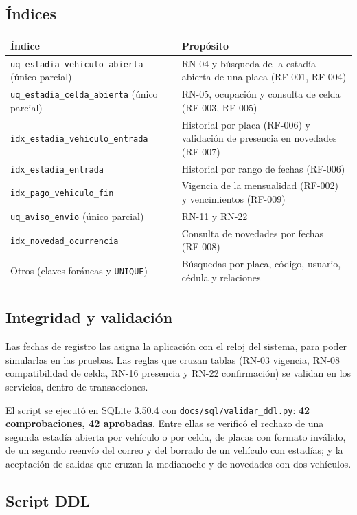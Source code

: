 \subsection{Índices}
\begin{longtable}{>{\raggedright\arraybackslash}p{6cm}>{\raggedright\arraybackslash}p{8.4cm}}
\toprule
\textbf{Índice} & \textbf{Propósito}\\
\midrule\endhead
\texttt{uq\_estadia\_vehiculo\_abierta} (único parcial) & RN-04 y búsqueda de la estadía abierta de una placa (RF-001, RF-004)\\
\texttt{uq\_estadia\_celda\_abierta} (único parcial) & RN-05, ocupación y consulta de celda (RF-003, RF-005)\\
\texttt{idx\_estadia\_vehiculo\_entrada} & Historial por placa (RF-006) y validación de presencia en novedades (RF-007)\\
\texttt{idx\_estadia\_entrada} & Historial por rango de fechas (RF-006)\\
\texttt{idx\_pago\_vehiculo\_fin} & Vigencia de la mensualidad (RF-002) y vencimientos (RF-009)\\
\texttt{uq\_aviso\_envio} (único parcial) & RN-11 y RN-22\\
\texttt{idx\_novedad\_ocurrencia} & Consulta de novedades por fechas (RF-008)\\
Otros (claves foráneas y \texttt{UNIQUE}) & Búsquedas por placa, código, usuario, cédula y relaciones\\
\bottomrule
\end{longtable}

\subsection{Integridad y validación}
Las fechas de registro las asigna la aplicación con el reloj del sistema, para poder simularlas en las pruebas. Las reglas que cruzan tablas (RN-03 vigencia, RN-08 compatibilidad de celda, RN-16 presencia y RN-22 confirmación) se validan en los servicios, dentro de transacciones.

El script se ejecutó en SQLite 3.50.4 con \texttt{docs/sql/validar\_ddl.py}: \textbf{42 comprobaciones, 42 aprobadas}. Entre ellas se verificó el rechazo de una segunda estadía abierta por vehículo o por celda, de placas con formato inválido, de un segundo reenvío del correo y del borrado de un vehículo con estadías; y la aceptación de salidas que cruzan la medianoche y de novedades con dos vehículos.

\subsection{Script DDL}

